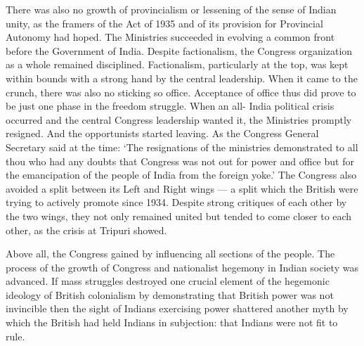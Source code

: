 \begin{multicols}{2}
There was also no growth of provincialism or lessening of the sense of Indian unity, as the framers of the Act of 1935 and of its provision for Provincial Autonomy had hoped. The Ministries succeeded in evolving a common front before the Government of India. Despite factionalism, the Congress organization as a whole remained disciplined. Factionalism, particularly at the top, was kept within bounds with a strong hand by the central leadership. When it came to the crunch, there was also no sticking so office. Acceptance of office thus did prove to be just one phase in the freedom struggle. When an all- India political crisis occurred and the central Congress leadership wanted it, the Ministries promptly resigned. And the opportunists started leaving. As the Congress General Secretary said at the time: `The resignations of the ministries demonstrated to all thou who had any doubts that Congress was not out for power and office but for the emancipation of the people of India from the foreign yoke.' The Congress also avoided a split between its Left and Right wings --- a split which the British were trying to actively promote since 1934. Despite strong critiques of each other by the two wings, they not only remained united but tended to come closer to each other, as the crisis at Tripuri showed. 

Above all, the Congress gained by influencing all sections of the people. The process of the growth of Congress and nationalist hegemony in Indian society was advanced. If mass struggles destroyed one crucial element of the hegemonic ideology of British colonialism by demonstrating that British power was not invincible then the sight of Indians exercising power shattered another myth by which the British had held Indians in subjection: that Indians were not fit to rule.
\end{multicols}
